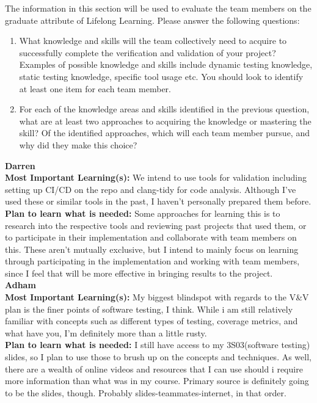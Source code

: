 \documentclass[12pt, titlepage]{article}
\begin{document}
The information in this section will be used to evaluate the team members on the
graduate attribute of Lifelong Learning.  Please answer the following questions:

\begin{enumerate}
  \item What knowledge and skills will the team collectively need to acquire to
  successfully complete the verification and validation of your project?
  Examples of possible knowledge and skills include dynamic testing knowledge,
  static testing knowledge, specific tool usage etc.  You should look to
  identify at least one item for each team member.
  \item For each of the knowledge areas and skills identified in the previous
  question, what are at least two approaches to acquiring the knowledge or
  mastering the skill?  Of the identified approaches, which will each team
  member pursue, and why did they make this choice?
\end{enumerate}

\noindent\textbf{Darren}\\
\textbf{Most Important Learning(s):} We intend to use tools for validation including setting up CI/CD on the repo and clang-tidy for code analysis. Although I've used these or similar tools in the past, I haven't personally prepared them before.\\
\textbf{Plan to learn what is needed:} Some approaches for learning this is to research into the respective tools and reviewing past projects that used them, or to participate in their implementation and collaborate with team members on this. These aren't mutually exclusive, but I intend to mainly focus on learning through participating in the implementation and working with team members, since I feel that will be more effective in bringing results to the project.\\

\noindent\textbf{Adham}\\
\textbf{Most Important Learning(s):} My biggest blindspot with regards to the V\&V plan is the finer points of software testing, I think. While i am still relatively familiar
with concepts such as different types of testing, coverage metrics, and what have you, I'm definitely more than a little rusty.\\
\textbf{Plan to learn what is needed:} I still have access to my 3S03(software testing) slides, so I plan to use those to brush up on the concepts and techniques. As well,
there are a wealth of online videos and resources that I can use should i require more information than what was in my course. Primary source is definitely going to be the
slides, though. Probably slides-teammates-internet, in that order. \\
\end{document}
